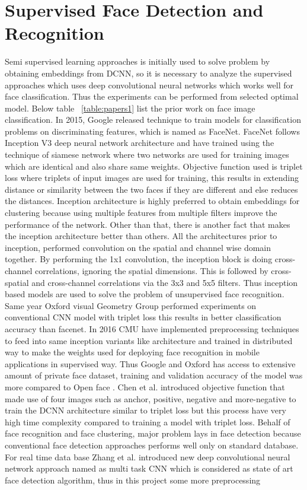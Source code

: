 \documentclass[a4paper,12pt, twoside]{NITKReport}
\begin{document}
\section{Supervised Face Detection and Recognition}
\par Semi supervised learning approaches is initially used to solve problem by obtaining embeddings from DCNN, so it is necessary to analyze the supervised approaches which uses deep convolutional neural networks which works well for face classification. Thus the experiments can be performed from selected optimal model. Below table ~\ref{table:papers1} list the prior work on face image classification. In 2015, Google released technique to train models for classification problems on discriminating features, which is named as FaceNet. FaceNet follows Inception V3\cite{DBLP:journals/corr/SzegedyVISW15} deep neural network architecture and have trained using the technique of siamese network \cite{Koch2015SiameseNN} where two networks are used for training images which are identical and also share same weights. Objective function used is triplet loss where triplets of input images are used for training, this results in extending distance or similarity between the two faces if they are different and else reduces the distances. Inception architecture is highly preferred to obtain embeddings for clustering because using multiple features from multiple filters improve the performance of the network. Other than that, there is another fact that makes the inception architecture better than others. All the architectures prior to inception, performed convolution on the spatial and channel wise domain together. By performing the 1x1 convolution, the inception block is doing cross-channel correlations, ignoring the spatial dimensions. This is followed by cross-spatial and cross-channel correlations via the 3x3 and 5x5 filters. Thus inception based models are used to solve the problem of unsupervised face recognition. Same year Oxford visual Geometry Group performed experiments on conventional CNN model with triplet loss this results in better classification accuracy than facenet. In 2016 CMU have implemented preprocessing techniques to feed into same inception variants like architecture \cite{amos2016openface} and trained in distributed way to make the weights used for deploying face recognition in mobile applications in supervised way. Thus Google and Oxford has access to extensive amount of private face dataset, training and validation accuracy of the model was more compared to Open face \cite{amos2016openface}. Chen et al.\cite{chen2017beyond} introduced objective function that made use of four images such as anchor, positive, negative and more-negative to train the DCNN architecture similar to triplet loss but this process have very high time complexity compared to training a model with triplet loss. Behalf of face recognition and face clustering, major problem lays in face detection because conventional face detection approaches performs well only on standard database. For real time data base Zhang et al. \cite{zhang2016joint} introduced new deep convolutional neural network approach named as multi task CNN which is considered as state of art face detection algorithm, thus in this project some more preprocessing 
\end{document}
